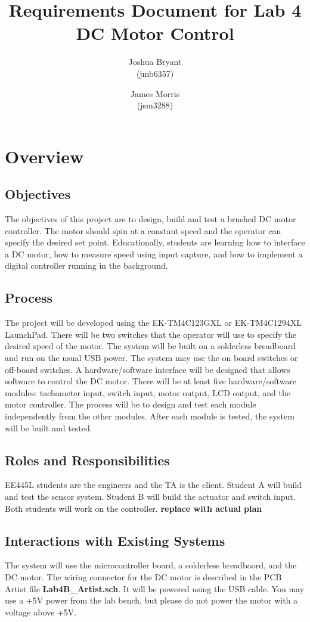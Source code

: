 \documentclass{article}
\begin{document}
\title{Requirements Document for Lab 4 DC Motor Control}
\author{Joshua Bryant \\(jmb6357) \and James Morris \\(jsm3288)}

\maketitle

\section{Overview}

	\subsection{Objectives}
		The objectives of this project are to design, build and test a brushed DC motor controller. The motor should spin at a constant speed and the operator can specify the desired set point. Educationally, students are learning how to interface a DC motor, how to measure speed using input capture, and how to implement a digital controller running in the background.
	\subsection{Process}
		The project will be developed using the EK-TM4C123GXL or EK-TM4C1294XL LaunchPad. There will be two switches that the operator will use to specify  the desired speed of the motor. The system will be built on a solderless breadboard and run on the usual USB power. The system may use the on board switches or off-board switches. A hardware/software interface will be designed that allows software to control the DC motor. There will be at least five hardware/software modules: tachometer input, switch input, motor output, LCD output, and the motor controller. The process will be to design and test each module independently from the other modules. After each module is tested, the system will be built and tested.
	\subsection{Roles and Responsibilities}
		EE445L students are the engineers and the TA is the client. Student A will build and test the sensor system. Student B will build the actuator and switch input. Both students will work on the controller. \textbf{replace with actual plan}
	\subsection{Interactions with Existing Systems}
		The system will use the microcontroller board, a solderless breadbaord, and the DC motor. The wiring connector for the DC motor is described in the PCB Artist file \textbf{Lab4B\_Artist.sch}. It will be powered using the USB cable. You may use a +5V power from the lab bench, but please do not power the motor with a voltage above +5V. 
\end{document}
